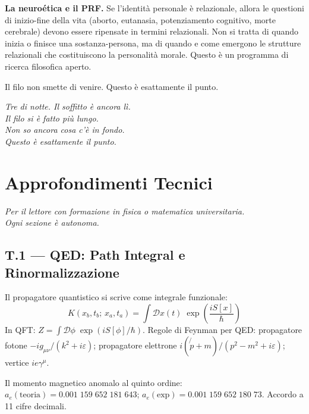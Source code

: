 \documentclass[11.5pt,a4paper,openany]{book}
\theoremstyle{remark}
\begin{document}
\textbf{La neuroética e il PRF.} Se l'identità personale è relazionale, allora le questioni di inizio-fine della vita (aborto, eutanasia, potenziamento cognitivo, morte cerebrale) devono essere ripensate in termini relazionali. Non si tratta di quando inizia o finisce una sostanza-persona, ma di quando e come emergono le strutture relazionali che costituiscono la personalità morale. Questo è un programma di ricerca filosofica aperto.

Il filo non smette di venire. Questo è esattamente il punto.

\vspace{2em}
\begin{center}
{\small\itshape\color{captionink}
Tre di notte. Il soffitto è ancora lì.\\[0.2em]
Il filo si è fatto più lungo.\\[0.2em]
Non so ancora cosa c'è in fondo.\\[0.4em]
Questo è esattamente il punto.}
\end{center}

\part*{Approfondimenti Tecnici}

\begin{center}\itshape
Per il lettore con formazione in fisica o matematica universitaria.\\
Ogni sezione è autonoma.
\end{center}
\clearpage

\chapter*{T.1 --- QED: Path Integral e Rinormalizzazione}

Il propagatore quantistico si scrive come integrale funzionale:
\[
K(x_b,t_b;\,x_a,t_a) = \int \mathcal{D}x(t)\;\exp\!\left(\frac{iS[x]}{\hbar}\right)
\]
In QFT: $Z = \int \mathcal{D}\phi\;\exp(iS[\phi]/\hbar)$. Regole di Feynman per QED: propagatore fotone $-ig_{\mu\nu}/(k^2+i\varepsilon)$; propagatore elettrone $i(\not{p}+m)/(p^2-m^2+i\varepsilon)$; vertice $ie\gamma^\mu$.

Il momento magnetico anomalo al quinto ordine: $a_e(\text{teoria}) = 0.001\;159\;652\;181\;643$; $a_e(\text{exp}) = 0.001\;159\;652\;180\;73$. Accordo a 11 cifre decimali.
\end{document}
